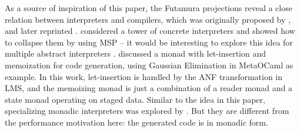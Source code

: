 As a source of inspiration of this paper, the Futamura projections reveal a
close relation between interpreters and compilers, which was
originally proposed by \citet{futamura1971partial}, and later reprinted \cite{Futamura1999}.
\citeauthor{Amin:2017:CTI:3177123.3158140} considered a tower of concrete
interpreters and showed how to collapse them by using MSP -- it would be interesting
to explore this idea for multiple abstract interpreters
\cite{Cousot:2019:AAI:3302515.3290355, Giacobazzi:2015:APA:2676726.2676987}.
\citet{10.1007/11561347_18} discussed a monad with let-insertion and
memoization for code generation, using Gaussian Elimination in MetaOCaml as
example. In this work, let-insertion is handled by the ANF transformation in
LMS, and the memoizing monad is just a combination of a reader monad and a state monad
operating on staged data.  Similar to the idea in this paper, specializing
monadic interpreters was explored by \citet{danvy1991compiling,
DBLP:conf/dsl/SheardBP99}. But they are different from the performance motivation
here: the generated code is in monadic form.
